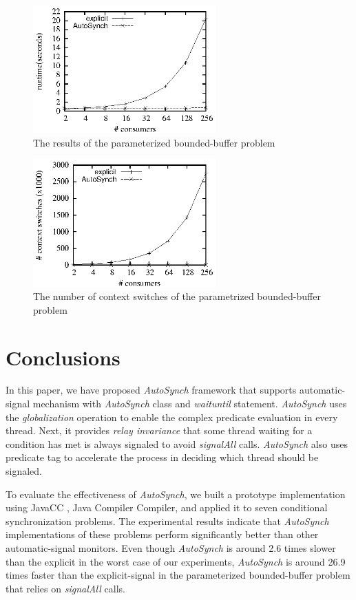 \documentclass[preprint]{sigplanconf}
\begin{document}
\begin{figure}[ht!]
  \centering
  \includegraphics[width=70mm]{fig/rpc.eps}
  \caption{The results of the parameterized bounded-buffer problem}
  \label{fig:rpc_eval}
\end{figure}

\begin{figure}[ht!]
  \centering
  \includegraphics[width=70mm]{fig/csrpc.eps}
  \caption{The number of context switches of the parametrized bounded-buffer 
  problem}
\label{fig:csrpc_eval}
\end{figure}



\section{Conclusions} \label{sec:conclu}
In this paper, we have proposed {\em AutoSynch} framework that supports 
automatic-signal mechanism with {\em AutoSynch} class and {\em waituntil} statement.
{\em AutoSynch} uses the {\em globalization} operation to enable the complex predicate 
evaluation in every thread. Next, it provides {\em relay invariance} that some
thread waiting for a condition has met is always signaled to avoid {\em signalAll}
calls. {\em AutoSynch} also uses predicate tag to accelerate the process in deciding
which thread should be signaled. 

To evaluate the effectiveness of {\em AutoSynch}, we built a prototype implementation
using JavaCC \cite{kod04}, Java Compiler Compiler,  and applied it to seven 
conditional synchronization problems. The experimental results indicate that 
{\em AutoSynch} implementations of these problems perform significantly better than
other automatic-signal monitors. Even though {\em AutoSynch} is around 2.6 times 
slower than the explicit in the worst case of our experiments, {\em AutoSynch} is
around 26.9 times faster than the explicit-signal in the parameterized 
bounded-buffer problem that relies on {\em signalAll} calls. 
\end{document}

